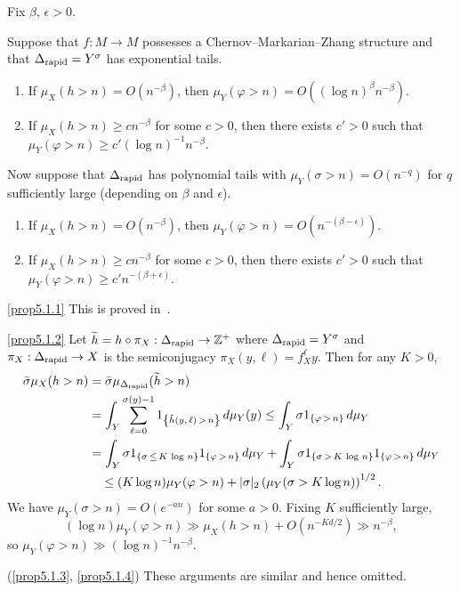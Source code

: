 \documentclass[AHL,Unicode,longabstracts,published]{cedram}
\newcommand{\Z}{\mathbb{Z}}
\newcommand{\DE}{\Delta_{\rm rapid}}
\newcommand{\eps}{\epsilon}
\newcommand*{\alphenumi}{\renewcommand*{\theenumi}{\alph{enumi}}}
\let\oldtilde\tilde
\renewcommand*{\tilde}[1]{\mathchoice{\widetilde{#1}}{\widetilde{#1}}{\oldtilde{#1}}{\oldtilde{#1}}}
\begin{document}
\begin{prop}\label{prop:rough}
Fix $\beta,\,\eps>0$.

Suppose that $f:M\to M$ possesses a Chernov--Markarian--Zhang structure and that $\DE=Y^\sigma$ has exponential tails.
\begin{enumerate}\alphenumi
\item \label{prop5.1.1}If $\mu_X(h>n)=O(n^{-\beta})$, then $\mu_Y(\varphi>n)=O((\log n)^\beta n^{-\beta})$.
\item \label{prop5.1.2}If $\mu_X(h>n)\ge cn^{-\beta}$ for some $c>0$, then there exists $c'>0$ such that $\mu_Y(\varphi>n)\ge c'(\log n)^{-1}n^{-\beta}$.
\end{enumerate}

Now suppose that $\DE$ has polynomial tails with $\mu_Y(\sigma>n)=O(n^{-q})$ for $q$ sufficiently large (depending on $\beta$ and $\eps$).
\begin{enumerate}\alphenumi
\setcounter{enumi}{2}
\item \label{prop5.1.3}If $\mu_X(h>n)=O(n^{-\beta})$, then $\mu_Y(\varphi>n)=O(n^{-(\beta-\eps)})$.
\item \label{prop5.1.4}If $\mu_X(h>n)\ge cn^{-\beta}$ for some $c>0$, then there exists $c'>0$ such that $\mu_Y(\varphi>n)\ge c'n^{-(\beta+\eps)}$.
\end{enumerate}
\end{prop}

\begin{proofc}
\eqref{prop5.1.1} This is proved in~\cite{ChernovZhang05,Markarian04}.

\eqref{prop5.1.2} Let $\tilde h=h\circ\pi_X:\DE\to\Z^+$ where $\DE=Y^\sigma$ and $\pi_X:\DE\to X$ is the semiconjugacy $\pi_X(y,\ell)=f_X^\ell y$. Then for any $K>0$,
\begin{align*}
\bar\sigma\mu_X(h>n) &=\bar\sigma \mu_{\DE}(\tilde h>n)\\
&=\int_Y\sum_{\ell=0}^{\sigma(y)-1}1_{\left\{\tilde h(y,\,\ell)\,>\,n\right\}}\,d\mu_Y(y)\le \int_Y \sigma 1_{\left\{\varphi\,>\,n\right\}}\,d\mu_Y \\
& = \int_Y \sigma 1_{\left\{\sigma\,\le\,K\,\log\,n\right\}} 1_{\left\{\varphi\,>\,n\right\}}\,d\mu_Y + \int_Y \sigma 1_{\left\{\sigma\,>\,K\,\log\,n\right\}} 1_{\left\{\varphi\,>\,n\right\}}\,d\mu_Y
\\ & \quad\le (K\log n)\mu_Y(\varphi>n)+|\sigma|_2\left(\mu_Y(\sigma>K\log n)\right)^{1/2}.
\end{align*}
We have $\mu_Y(\sigma>n)=O(e^{-an})$ for some $a>0$. Fixing $K$ sufficiently large,
\[
(\log n)\mu_Y(\varphi>n) \gg \mu_X(h>n)+O\left(n^{-K d/2}\right)\gg n^{-\beta},
\]
so $\mu_Y(\varphi>n)\gg (\log n)^{-1}n^{-\beta}$.

(\ref{prop5.1.3}, \ref{prop5.1.4}) These arguments are similar and hence omitted.
\end{proofc}
\end{document}
